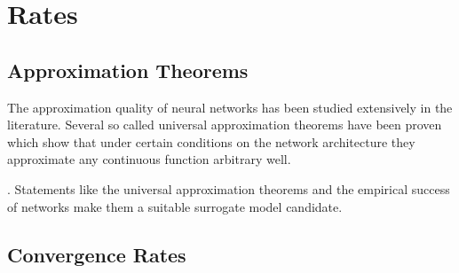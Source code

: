 \section{Rates}
\label{seq:rates}

\subsection{Approximation Theorems}

The approximation quality of neural networks has been studied extensively in the
literature. Several so called universal approximation theorems have been proven which
show that under certain conditions on the network architecture they approximate any
continuous function arbitrary well.

\cite{Hornik.1991}. Statements like the universal
approximation theorems and the empirical success of networks make them a suitable
surrogate model candidate.

\subsection{Convergence Rates}
